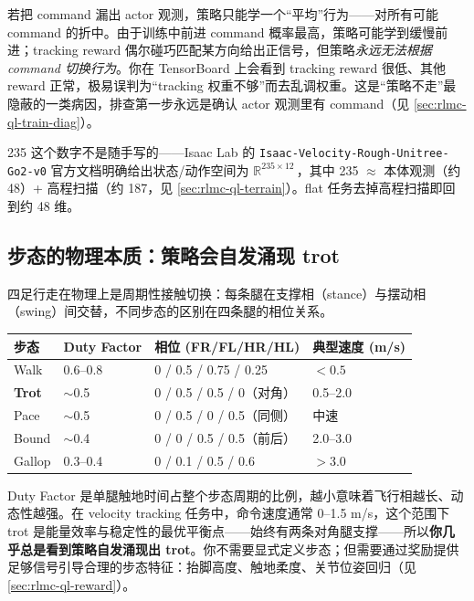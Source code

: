 \begin{insight}\label{ins:rlmc-ql-nocmd}
若把 command 漏出 actor 观测，策略只能学一个“平均”行为——对所有可能 command 的折中。由于训练中前进 command 概率最高，策略可能学到缓慢前进；tracking reward 偶尔碰巧匹配某方向给出正信号，但策略\emph{永远无法根据 command 切换行为}。你在 TensorBoard 上会看到 tracking reward 很低、其他 reward 正常，极易误判为“tracking 权重不够”而去乱调权重。这是“策略不走”最隐蔽的一类病因，排查第一步永远是确认 actor 观测里有 command（见 \cref{sec:rlmc-ql-train-diag}）。
\end{insight}

235 这个数字不是随手写的——Isaac Lab 的 \verb|Isaac-Velocity-Rough-Unitree-Go2-v0| 官方文档明确给出状态/动作空间为 $\mathbb{R}^{235\times 12}$\,\cite{mittal2025isaaclab}，其中 235 $\approx$ 本体观测（约 48）+ 高程扫描（约 187，见 \cref{sec:rlmc-ql-terrain}）。flat 任务去掉高程扫描即回到约 48 维。

\subsection{步态的物理本质：策略会自发涌现 trot}
\label{sec:rlmc-ql-gait}

四足行走在物理上是周期性接触切换：每条腿在支撑相（stance）与摆动相（swing）间交替，不同步态的区别在四条腿的相位关系。

\begin{center}
\small
\begin{tabular}{@{}llll@{}}
\toprule
步态 & Duty Factor & 相位 (FR/FL/HR/HL) & 典型速度 (m/s) \\
\midrule
Walk & 0.6--0.8 & 0 / 0.5 / 0.75 / 0.25 & $<0.5$ \\
\textbf{Trot} & $\sim$0.5 & 0 / 0.5 / 0.5 / 0（对角） & 0.5--2.0 \\
Pace & $\sim$0.5 & 0 / 0.5 / 0 / 0.5（同侧） & 中速 \\
Bound & $\sim$0.4 & 0 / 0 / 0.5 / 0.5（前后） & 2.0--3.0 \\
Gallop & 0.3--0.4 & 0 / 0.1 / 0.5 / 0.6 & $>3.0$ \\
\bottomrule
\end{tabular}
\end{center}

Duty Factor 是单腿触地时间占整个步态周期的比例，越小意味着飞行相越长、动态性越强。在 velocity tracking 任务中，命令速度通常 0--1.5 m/s，这个范围下 trot 是能量效率与稳定性的最优平衡点——始终有两条对角腿支撑——所以\textbf{你几乎总是看到策略自发涌现出 trot}。你不需要显式定义步态；但需要通过奖励提供足够信号引导合理的步态特征：抬脚高度、触地柔度、关节位姿回归（见 \cref{sec:rlmc-ql-reward}）。

